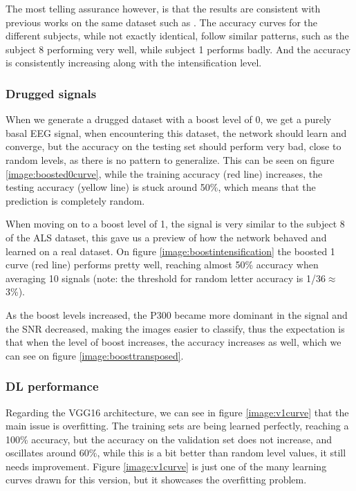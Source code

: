 \documentclass[conference]{IEEEtran}
\begin{document}
The most telling assurance however, is that the results are consistent with previous works on the same dataset such as \cite{ramele2019histogram}. The accuracy curves for the different subjects, while not exactly identical, follow similar patterns, such as the subject 8 performing very well, while subject 1 performs badly. And the accuracy is consistently increasing along with the intensification level.


\subsubsection{Drugged signals}
When we generate a drugged dataset with a boost level of 0, we get a purely basal EEG signal, when encountering this dataset, the network should learn and converge, but the accuracy on the testing set should perform very bad, close to random levels, as there is no pattern to generalize. This can be seen on figure \ref{image:boosted0curve}, while the training accuracy (red line) increases, the testing accuracy (yellow line) is stuck around 50\%, which means that the prediction is completely random.

When moving on to a boost level of 1, the signal is very similar to the subject 8 of the ALS dataset, this gave us a preview of how the network behaved and learned on a real dataset. On figure \ref{image:boostintensification} the boosted 1 curve (red line) performs pretty well, reaching almost 50\% accuracy when averaging 10 signals (note: the threshold for random letter accuracy is 1/36$\approx$3\%).

As the boost levels increased, the P300 became more dominant in the signal and the SNR decreased, making the images easier to classify, thus the expectation is that when the level of boost increases, the accuracy increases as well, which we can see on figure \ref{image:boosttransposed}.

\subsubsection{DL performance}

Regarding the VGG16 architecture, we  can see in figure \ref{image:v1curve} that the main issue is overfitting. The training sets are being learned perfectly, reaching a 100\% accuracy, but the accuracy on the validation set does not increase, and oscillates around 60\%, while this is a bit better than random level values, it still needs improvement. Figure \ref{image:v1curve} is just one of the many learning curves drawn for this version, but it showcases the overfitting problem.
\end{document}
